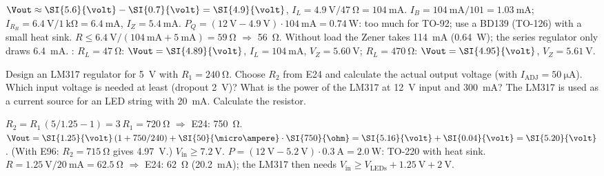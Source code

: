\begin{solution}
\begin{talist}
\ta $\Vout \approx \SI{5.6}{\volt}-\SI{0.7}{\volt} = \SI{4.9}{\volt}$, $I_L = \SI{4.9}{\volt}/\SI{47}{\ohm} = \SI{104}{\milli\ampere}$.
\ta $I_B = \SI{104}{\milli\ampere}/101 = \SI{1.03}{\milli\ampere}$; $I_{R_B} = \SI{6.4}{\volt}/\SI{1}{\kilo\ohm} = \SI{6.4}{\milli\ampere}$, $I_Z = \SI{5.4}{\milli\ampere}$.
\ta $P_Q = (\SI{12}{\volt}-\SI{4.9}{\volt})\cdot\SI{104}{\milli\ampere} = \SI{0.74}{\watt}$: too much for TO-92;
    use a BD139 (TO-126) with a small heat sink.
\ta $R \le \SI{6.4}{\volt}/(\SI{104}{\milli\ampere}+\SI{5}{\milli\ampere}) = \SI{59}{\ohm}$ $\Rightarrow$ \SI{56}{\ohm}.
    Without load the Zener takes \SI{114}{\milli\ampere} (\SI{0.64}{\watt}); the series regulator only draws \SI{6.4}{\milli\ampere}.
\ta {}: $R_L=\SI{47}{\ohm}$: $\Vout=\SI{4.89}{\volt}$, $I_L = \SI{104}{\milli\ampere}$, $V_Z=\SI{5.60}{\volt}$;
    $R_L=\SI{470}{\ohm}$: $\Vout=\SI{4.95}{\volt}$, $V_Z=\SI{5.61}{\volt}$.
\end{talist}
\end{solution}

\begin{talist}
\ta Design an LM317 regulator for \SI{5}{\volt} with $R_1 = \SI{240}{\ohm}$. Choose $R_2$ from E24 and calculate the actual output voltage (with $I_\mathrm{ADJ} = \SI{50}{\micro\ampere}$).
\ta Which input voltage is needed at least (dropout \SI{2}{\volt})? What is the power of the LM317 at \SI{12}{\volt} input and \SI{300}{\milli\ampere}?
\ta The LM317 is used as a current source for an LED string with \SI{20}{\milli\ampere}. Calculate the resistor.
\end{talist}

\begin{solution}
\begin{talist}
\ta $R_2 = R_1\,(5/1.25 - 1) = 3\,R_1 = \SI{720}{\ohm}$ $\Rightarrow$ E24: \SI{750}{\ohm}.
    $\Vout = \SI{1.25}{\volt}\,(1+750/240) + \SI{50}{\micro\ampere}\cdot\SI{750}{\ohm} = \SI{5.16}{\volt}+\SI{0.04}{\volt} = \SI{5.20}{\volt}$.
    (With E96: $R_2 = \SI{715}{\ohm}$ gives \SI{4.97}{\volt}.)
\ta $V_\mathrm{in} \ge \SI{7.2}{\volt}$. $P = (\SI{12}{\volt}-\SI{5.2}{\volt})\cdot\SI{0.3}{\ampere} = \SI{2.0}{\watt}$: TO-220 with heat sink.
\ta $R = \SI{1.25}{\volt}/\SI{20}{\milli\ampere} = \SI{62.5}{\ohm}$ $\Rightarrow$ E24: \SI{62}{\ohm} (\SI{20.2}{\milli\ampere}); the LM317 then needs $V_\mathrm{in} \ge V_\mathrm{LEDs} + \SI{1.25}{\volt} + \SI{2}{\volt}$.
\end{talist}
\end{solution}

